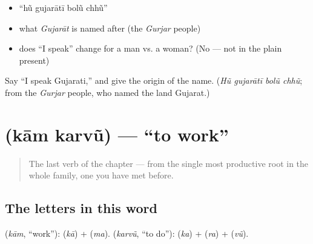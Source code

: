 \begin{itemize}
\raggedright
  \item \textquotedblleft{}hũ gujarātī bolũ chhũ\textquotedblright{}
  \item what \emph{Gujarāt} is named after (the \emph{Gurjar} people)
  \item does \textquotedblleft{}I speak\textquotedblright{} change for a man vs. a woman? (No — not in the plain present)
\end{itemize}

\begin{tcolorbox}[breakable,colback=teal!4,colframe=teal!35!black,title={Before you move on}]
Say \textquotedblleft{}I speak Gujarati,\textquotedblright{} and give the origin of the name. (\emph{Hũ gujarātī bolũ chhũ}; from the \emph{Gurjar} people, who named the land Gujarat.)
\end{tcolorbox}
\section[\texorpdfstring{\gu{કામ} \gu{કરવું} (kām karvũ)}{કામ કરવું (kām karvũ)}]{  (kām karvũ) — \textquotedblleft{}to work\textquotedblright{}}

\label{lesson:GU-C05-kaam-karvun}



\begin{quote}
The last verb of the chapter — from the single most productive root in the whole family, one you have met before.
\end{quote}

\subsection*{The letters in this word}
\textbf{} (\emph{kām}, \textquotedblleft{}work\textquotedblright{}): \textbf{} (\emph{kā}) + \textbf{} (\emph{ma}). \textbf{} (\emph{karvũ}, \textquotedblleft{}to do\textquotedblright{}): \textbf{} (\emph{ka}) + \textbf{} (\emph{ra}) + \textbf{} (\emph{vũ}).


